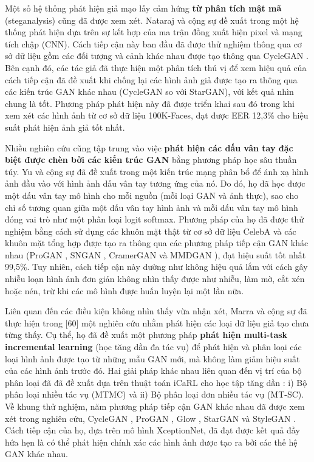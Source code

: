 \documentclass{article}
\begin{document}
Một số hệ thống phát hiện giả mạo lấy cảm hứng \textbf{từ phân tích mật mã} (steganalysis) cũng đã được xem xét. Nataraj và cộng sự đề xuất trong  một hệ thống phát hiện dựa trên sự kết hợp của ma trận đồng xuất hiện pixel và mạng tích chập (CNN). Cách tiếp cận này ban đầu đã được thử nghiệm thông qua cơ sở dữ liệu gồm các đối tượng và cảnh khác nhau được tạo thông qua CycleGAN . Bên cạnh đó, các tác giả đã thực hiện một phân tích thú vị để xem hiệu quả của cách tiếp cận đã đề xuất khi chống lại các hình ảnh giả được tạo ra thông qua các kiến trúc GAN khác nhau (CycleGAN so với StarGAN), với kết quả nhìn chung là tốt. Phương pháp phát hiện này đã được triển khai sau đó trong  khi xem xét các hình ảnh từ cơ sở dữ liệu 100K-Faces, đạt được EER 12,3\% cho hiệu suất phát hiện ảnh giả tốt nhất.

Nhiều nghiên cứu cũng tập trung vào việc \textbf{phát hiện các dấu vân tay đặc biệt được chèn bởi các kiến trúc GAN} bằng phương pháp học sâu thuần túy. Yu và cộng sự đã đề xuất trong  một kiến trúc mạng phân bổ để ánh xạ hình ảnh đầu vào với hình ảnh dấu vân tay tương ứng của nó. Do đó, họ đã học được một dấu vân tay mô hình cho mỗi nguồn (mỗi loại GAN và ảnh thực), sao cho chỉ số tương quan giữa một dấu vân tay hình ảnh và mỗi dấu vân tay mô hình đóng vai trò như một phân loại logit softmax. Phương pháp của họ đã được thử nghiệm bằng cách sử dụng các khuôn mặt thật từ cơ sở dữ liệu CelebA  và các khuôn mặt tổng hợp được tạo ra thông qua các phương pháp tiếp cận GAN khác nhau (ProGAN , SNGAN , CramerGAN  và MMDGAN ), đạt hiệu suất tốt nhất 99,5\%. Tuy nhiên, cách tiếp cận này dường như không hiệu quả lắm với cách gây nhiễu loạn hình ảnh đơn giản không nhìn thấy được như nhiễu, làm mờ, cắt xén hoặc nén, trừ khi các mô hình được huấn luyện lại một lần nữa.

Liên quan đến các điều kiện không nhìn thấy vừa nhận xét, Marra và cộng sự đã thực hiện trong [60] một nghiên cứu nhằm phát hiện các loại dữ liệu giả tạo chưa từng thấy. Cụ thể, họ đã đề xuất một phương pháp \textbf{phát hiện multi-task incremental learning} (học tăng dần đa tác vụ) để phát hiện và phân loại các loại hình ảnh được tạo từ những mẫu GAN mới, mà không làm giảm hiệu suất của các hình ảnh trước đó. Hai giải pháp khác nhau liên quan đến vị trí của bộ phân loại đã đã đề xuất dựa trên thuật toán iCaRL cho học tập tăng dần : i) Bộ phân loại nhiều tác vụ (MTMC) và ii) Bộ phân loại đơn nhiều tác vụ (MT-SC). Về khung thử nghiệm, năm phương pháp tiếp cận GAN khác nhau đã được xem xét trong nghiên cứu, CycleGAN , ProGAN , Glow , StarGAN  và StyleGAN . Cách tiếp cận của họ, dựa trên mô hình XceptionNet, đã đạt được kết quả đầy hứa hẹn là có thể phát hiện chính xác các hình ảnh được tạo ra bởi các thế hệ GAN khác nhau.
\end{document}
